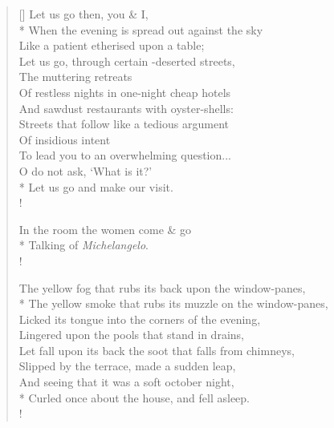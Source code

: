 \documentclass[MAIN]{subfiles}
\begin{document}
\settowidth{\versewidth}{The yellow fog that rubs its back upon the window-panes,}
\begin{verse}[\versewidth]
Let us go then, you \& I,\\*
When the evening is spread out against the sky\\
Like a patient etherised upon a table;\\
Let us go, through certain -deserted streets,\\
The muttering retreats\\
Of restless nights in one-night cheap hotels\\
And sawdust restaurants with oyster-shells:\\
Streets that follow like a tedious argument\\
Of insidious intent\\
To lead you to an overwhelming question...\\
O do not ask, `What is it?'\\*
Let us go and make our visit.\\!

In the room the women come \& go\\*
Talking of \emph{Michelangelo}.\\!

The yellow fog that rubs its back upon the window-panes,\\*
The yellow smoke that rubs its muzzle on the window-panes,\\
Licked its tongue into the corners of the evening,\\
Lingered upon the pools that stand in drains,\\
Let fall upon its back the soot that falls from chimneys,\\
Slipped by the terrace, made a sudden leap,\\
And seeing that it was a soft october night,\\* 
Curled once about the house, and fell asleep.\\!


\end{verse}
\end{document}
